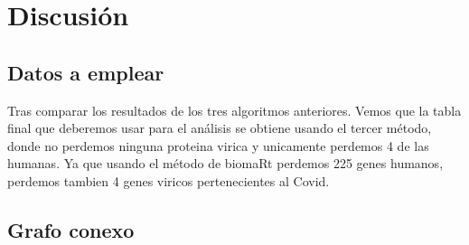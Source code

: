 \section{Discusión}
\begin{Document}

\subsection{Datos a emplear}
Tras comparar los resultados de los tres algoritmos anteriores. Vemos que la tabla final que deberemos usar para el análisis se obtiene usando el tercer método, donde no perdemos ninguna proteina virica y unicamente perdemos 4 de las humanas. Ya que usando el método de 
biomaRt perdemos 225 genes humanos, perdemos tambien 4 genes viricos pertenecientes al Covid. 

\subsection{Grafo conexo}
\end{Document}
